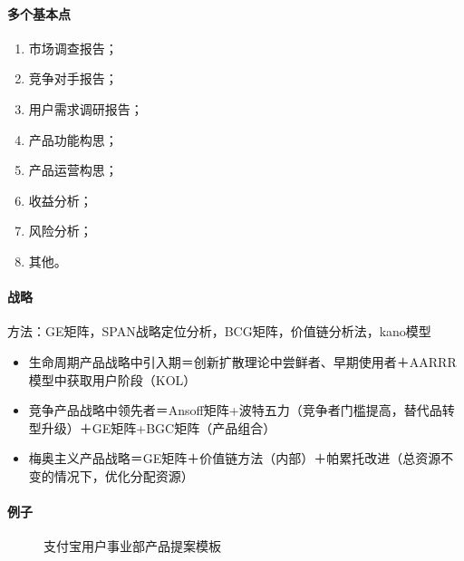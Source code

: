 \documentclass[letterpaper,10pt,english]{sphinxmanual}
\begin{document}
\paragraph{多个基本点}
\label{\detokenize{chapter_knowledge/BRD:id7}}\begin{enumerate}
%
\item {} 
市场调查报告；

\item {} 
竞争对手报告；

\item {} 
用户需求调研报告；

\item {} 
产品功能构思；

\item {} 
产品运营构思；

\item {} 
收益分析；

\item {} 
风险分析；

\item {} 
其他。

\end{enumerate}


\paragraph{战略}
\label{\detokenize{chapter_knowledge/BRD:id8}}
方法：GE矩阵，SPAN战略定位分析，BCG矩阵，价值链分析法，kano模型
%
\begin{footnote}[487]\sphinxAtStartFootnote
{}
%
\end{footnote}
\begin{itemize}
\item {} 
生命周期产品战略中引入期＝创新扩散理论中尝鲜者、早期使用者＋AARRR模型中获取用户阶段（KOL）

\item {} 
竞争产品战略中领先者＝Ansoff矩阵+波特五力（竞争者门槛提高，替代品转型升级）＋GE矩阵+BGC矩阵（产品组合）

\item {} 
梅奥主义产品战略＝GE矩阵＋价值链方法（内部）＋帕累托改进（总资源不变的情况下，优化分配资源）

\end{itemize}


\paragraph{例子}
\label{\detokenize{chapter_knowledge/BRD:id9}}
\begin{figure}[H]
\centering
\capstart

\noindent{}
\caption{支付宝用户事业部产品提案模板}\label{\detokenize{chapter_knowledge/BRD:id20}}\end{figure}
\end{document}
